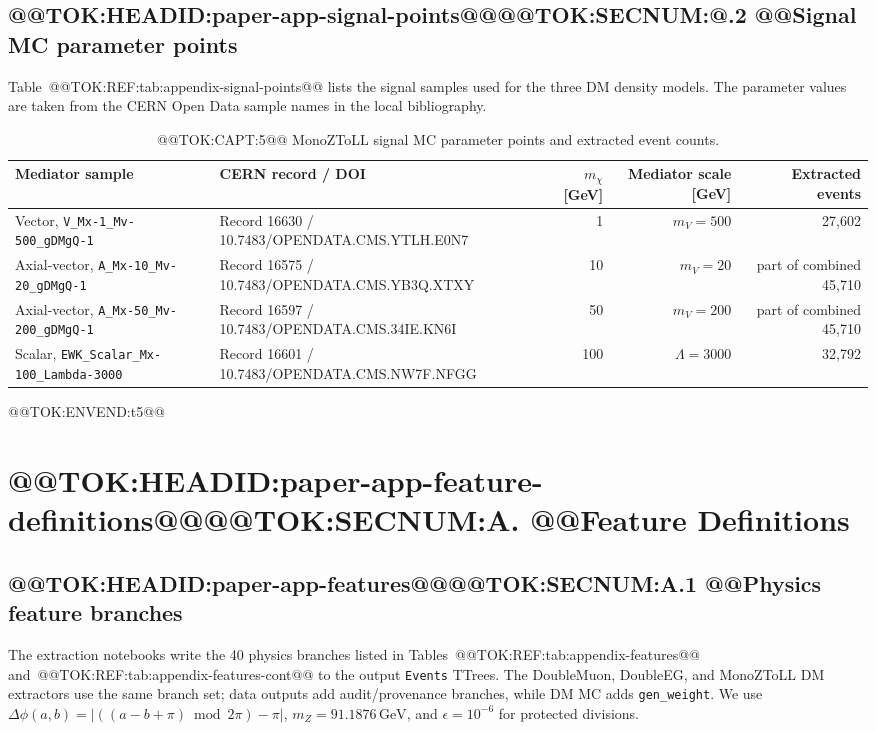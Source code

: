 \documentclass[11pt]{article}
\newcommand{\GeV}{\text{GeV}}
\begin{document}
\subsection{@@TOK:HEADID:paper-app-signal-points@@@@TOK:SECNUM:@.2 @@Signal MC parameter points}

Table~@@TOK:REF:tab:appendix-signal-points@@ lists the signal samples used for the three DM
density models. The parameter values are taken from the CERN Open Data sample names in
the local bibliography.

\begin{table}[h]
\centering
\caption{@@TOK:CAPT:5@@ MonoZToLL signal MC parameter points and extracted event counts.}
\label{tab:appendix-signal-points}
%
\begin{tabular}{llrrr}
\toprule
Mediator sample & CERN record / DOI & \(m_{\chi}\) [GeV] & Mediator scale [GeV] & Extracted events \\
\midrule
Vector, \texttt{V\_Mx-1\_Mv-500\_gDMgQ-1} & Record 16630 / 10.7483/OPENDATA.CMS.YTLH.E0N7 & 1 & \(m_V=500\) & 27,602 \\
Axial-vector, \texttt{A\_Mx-10\_Mv-20\_gDMgQ-1} & Record 16575 / 10.7483/OPENDATA.CMS.YB3Q.XTXY & 10 & \(m_V=20\) & part of combined 45,710 \\
Axial-vector, \texttt{A\_Mx-50\_Mv-200\_gDMgQ-1} & Record 16597 / 10.7483/OPENDATA.CMS.34IE.KN6I & 50 & \(m_V=200\) & part of combined 45,710 \\
Scalar, \texttt{EWK\_Scalar\_Mx-100\_Lambda-3000} & Record 16601 / 10.7483/OPENDATA.CMS.NW7F.NFGG & 100 & \(\Lambda=3000\) & 32,792 \\
\bottomrule
\end{tabular}

@@TOK:ENVEND:t5@@\end{table}
 
\section{@@TOK:HEADID:paper-app-feature-definitions@@@@TOK:SECNUM:A. @@Feature Definitions}

\subsection{@@TOK:HEADID:paper-app-features@@@@TOK:SECNUM:A.1 @@Physics feature branches}

The extraction notebooks write the 40 physics branches listed in
Tables~@@TOK:REF:tab:appendix-features@@ and~@@TOK:REF:tab:appendix-features-cont@@ to the output \texttt{Events} TTrees. The DoubleMuon,
DoubleEG, and MonoZToLL DM extractors use the same branch set; data outputs add
audit/provenance branches, while DM MC adds \texttt{gen\_weight}. We use
\(\Delta\phi(a,b)=|((a-b+\pi)\bmod 2\pi)-\pi|\), \(m_Z=91.1876\,\GeV\), and
\(\epsilon=10^{-6}\) for protected divisions.
\end{document}
